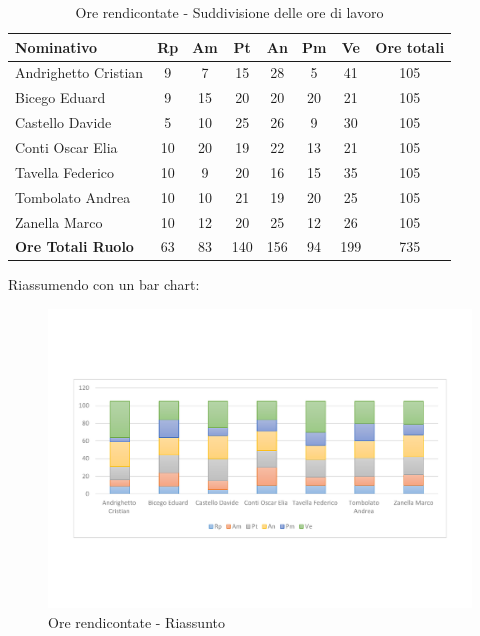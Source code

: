 \documentclass[../PianoProgetto.tex]{subfiles}
\begin{document}
	\begin{table}[h]
		\begin{tabularx}{\textwidth}{l  * {6}{C}  c}
			\toprule
			\textbf{Nominativo} & \textbf{Rp} & \textbf{Am} & \textbf{Pt} 
						& \textbf{An} & \textbf{Pm} & \textbf{Ve} & \textbf{Ore totali} \\
			\midrule
			Andrighetto Cristian & 9 & 7 & 15 & 28 & 5 & 41 &	105 \\
			Bicego Eduard & 9 & 15 & 20 & 20 & 20 & 21 & 105 \\
			Castello Davide & 5 & 10 & 25 & 26 & 9 & 30 & 105 \\
			Conti Oscar Elia & 10 & 20 & 19 & 22 & 13 & 21 & 105 \\
			Tavella Federico &	10 & 9 & 20 & 16 & 15 & 35 & 105 \\
			Tombolato Andrea & 10 & 10 & 21 & 19 & 20 & 25 & 105 \\
			Zanella Marco & 10 & 12 & 20 & 25 & 12 & 26 & 105 \\
			\midrule			
			\textbf{Ore Totali Ruolo} & 63 & 83 & 140 & 156 & 94 & 199 & 735 \\
			\bottomrule
		\end{tabularx}
		\caption{Ore rendicontate - Suddivisione delle ore di lavoro}
		\label{tab:rendicontate_ore}
	\end{table}
	
\newpage
\vfill		
	Riassumendo con un bar chart:

	\begin{figure}[!h]
		\centering
		\includegraphics[width=\textwidth , trim=2cm 5cm 2cm 5cm]{grafici/Riepilogo/Rendicontate/ore-persona}
			\caption{Ore rendicontate - Riassunto}
		\label{fig:BarChart-rendicontate_ore}
	\end{figure}
	
\end{document}
